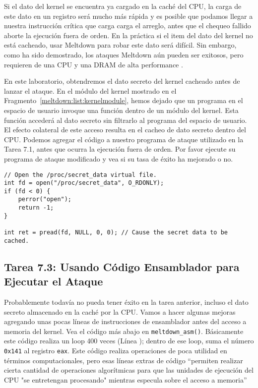 Si el dato del kernel se encuentra ya cargado en la caché del CPU, la carga de este dato en un registro será mucho más rápida y es posible que podamos llegar a nuestra instrucción crítica que carga carga el arreglo, antes que el chequeo fallido aborte la ejecución fuera de orden. En la práctica si el item del dato del kernel no está cacheado, usar Meltdown para robar este dato será difícil. Sin embargo, como ha sido demostrado, los ataques Meltdown aún pueden ser exitosos, pero requieren de una CPU y una DRAM de alta performance \cite{meltdowdemo}.

En este laboratorio, obtendremos el dato secreto del kernel cacheado antes de lanzar el ataque.
En el módulo del kernel mostrado en el Fragmento~\ref{meltdown:list:kernelmodule}, hemos dejado que un programa en el espacio de usuario invoque una función dentro de un módulo del kernel. Esta función accederá al dato secreto sin filtrarlo al programa del espacio de usuario. El efecto colateral de este acceso resulta en el cacheo de dato secreto dentro del CPU. Podemos agregar el código a nuestro programa de ataque utilizado en la Tarea 7.1, antes que ocurra la ejecución fuera de orden.
Por favor ejecute su programa de ataque modificado y vea si su tasa de éxito ha mejorado o no.

\begin{lstlisting}
// Open the /proc/secret_data virtual file.
int fd = open("/proc/secret_data", O_RDONLY);
if (fd < 0) {
    perror("open");
    return -1;
}

int ret = pread(fd, NULL, 0, 0); // Cause the secret data to be cached.
\end{lstlisting}



\subsection{Tarea 7.3: Usando Código Ensamblador para Ejecutar el Ataque}

Probablemente todavía no pueda tener éxito en la tarea anterior, incluso el dato secreto almacenado en la caché por la CPU.
Vamos a hacer algunas mejoras agregando unas pocas líneas de instrucciones de ensamblador antes del acceso a memoria del kernel. Vea el código más abajo en \texttt{meltdown\_asm()}. Básicamente este código realiza un loop 400 veces (Línea   ); dentro de ese loop, suma el número \texttt{0x141} al registro \texttt{eax}. Este código realiza operaciones de poca utilidad en términos computacionales, pero esas líneas extras de código ``permiten realizar cierta cantidad de operaciones algorítmicas para que las unidades de ejecución del CPU "se entretengan procesando" mientras especula sobre el acceso a memoria''~\cite{boldin}


